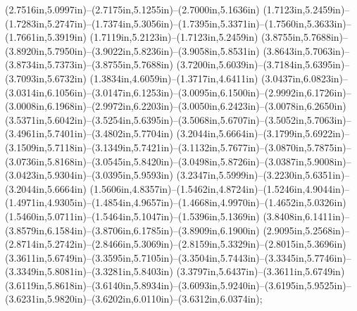 (2.7516in,5.0997in)--(2.7175in,5.1255in)--(2.7000in,5.1636in) (1.7123in,5.2459in)--(1.7283in,5.2747in)--(1.7374in,5.3056in)--(1.7395in,5.3371in)--(1.7560in,5.3633in)--(1.7661in,5.3919in) (1.7119in,5.2123in)--(1.7123in,5.2459in) (3.8755in,5.7688in)--(3.8920in,5.7950in)--(3.9022in,5.8236in)--(3.9058in,5.8531in) (3.8643in,5.7063in)--(3.8734in,5.7373in)--(3.8755in,5.7688in) (3.7200in,5.6039in)--(3.7184in,5.6395in)--(3.7093in,5.6732in) (1.3834in,4.6059in)--(1.3717in,4.6411in) (3.0437in,6.0823in)--(3.0314in,6.1056in)--(3.0147in,6.1253in)--(3.0095in,6.1500in)--(2.9992in,6.1726in)--(3.0008in,6.1968in)--(2.9972in,6.2203in)--(3.0050in,6.2423in)--(3.0078in,6.2650in) (3.5371in,5.6042in)--(3.5254in,5.6395in)--(3.5068in,5.6707in)--(3.5052in,5.7063in)--(3.4961in,5.7401in)--(3.4802in,5.7704in) (3.2044in,5.6664in)--(3.1799in,5.6922in)--(3.1509in,5.7118in)--(3.1349in,5.7421in)--(3.1132in,5.7677in)--(3.0870in,5.7875in)--(3.0736in,5.8168in)--(3.0545in,5.8420in)--(3.0498in,5.8726in)--(3.0387in,5.9008in)--(3.0423in,5.9304in)--(3.0395in,5.9593in) (3.2347in,5.5999in)--(3.2230in,5.6351in)--(3.2044in,5.6664in) (1.5606in,4.8357in)--(1.5462in,4.8724in)--(1.5246in,4.9044in)--(1.4971in,4.9305in)--(1.4854in,4.9657in)--(1.4668in,4.9970in)--(1.4652in,5.0326in) (1.5460in,5.0711in)--(1.5464in,5.1047in)--(1.5396in,5.1369in) (3.8408in,6.1411in)--(3.8579in,6.1584in)--(3.8706in,6.1785in)--(3.8909in,6.1900in)
(2.9095in,5.2568in)--(2.8714in,5.2742in)--(2.8466in,5.3069in)--(2.8159in,5.3329in)--(2.8015in,5.3696in) (3.3611in,5.6749in)--(3.3595in,5.7105in)--(3.3504in,5.7443in)--(3.3345in,5.7746in)--(3.3349in,5.8081in)--(3.3281in,5.8403in) (3.3797in,5.6437in)--(3.3611in,5.6749in) (3.6119in,5.8618in)--(3.6140in,5.8934in)--(3.6093in,5.9240in)--(3.6195in,5.9525in)--(3.6231in,5.9820in)--(3.6202in,6.0110in)--(3.6312in,6.0374in);
